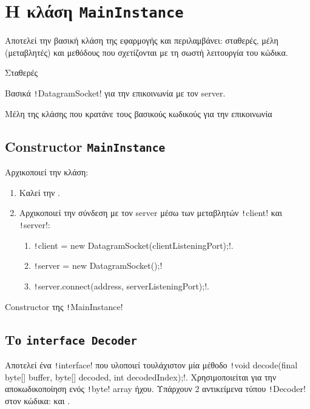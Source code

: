 \section{Η κλάση \texttt{MainInstance}}\label{section:MainInstance}
Αποτελεί την βασική κλάση της εφαρμογής \appname{} και περιλαμβάνει:
σταθερές, μέλη (μεταβλητές) και μεθόδους που σχετίζονται με τη σωστή λειτουργία του κώδικα.

\begin{code}
\caption{Σταθερές}
\label{listing:constants}
\end{code}

\begin{code}
\caption{Βασικά \texttt!DatagramSocket! για την επικοινωνία με τον server.}
\end{code}

\begin{code}
\caption{Μέλη της κλάσης που κρατάνε τους βασικούς κωδικούς για την επικοινωνία}
\end{code}

\subsection{Constructor \texttt{MainInstance}}
Αρχικοποιεί την κλάση:
\begin{enumerate}
\item Καλεί την .
\item Αρχικοποιεί την σύνδεση με τον server μέσω των μεταβλητών \texttt!client! και \texttt!server!:
\begin{enumerate}
\item \texttt!client = new DatagramSocket(clientListeningPort);!.
\item \texttt!server = new DatagramSocket();!
\item \texttt!server.connect(address, serverListeningPort);!.
\end{enumerate}
\end{enumerate}

\begin{code}
\caption{Constructor της \texttt!MainInstance!}
\end{code}

\subsection{Το \texttt{interface Decoder}}
Αποτελεί ένα \texttt!interface! που υλοποιεί τουλάχιστον μία μέθοδο \texttt!void decode(final byte[] buffer, byte[] decoded, int decodedIndex);!.
Χρησιμοποιείται για την αποκωδικοποίηση ενός \texttt!byte! array ήχου.
Υπάρχουν 2 αντικείμενα τύπου \texttt!Decoder! στον κώδικα:
 και .
\begin{code}
\end{code}

